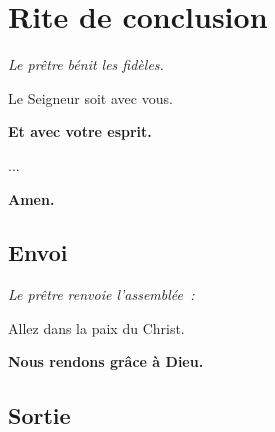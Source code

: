 \section*{Rite de conclusion}

\emph{Le prêtre bénit les fidèles.}

Le Seigneur soit avec vous.

{\bf Et avec votre esprit.}

...

{\bf Amen.}



\subsection*{Envoi}

\emph{Le prêtre renvoie l'assemblée~:}

Allez dans la paix du Christ.

{\bf Nous rendons grâce à Dieu.}

\subsection*{Sortie}

